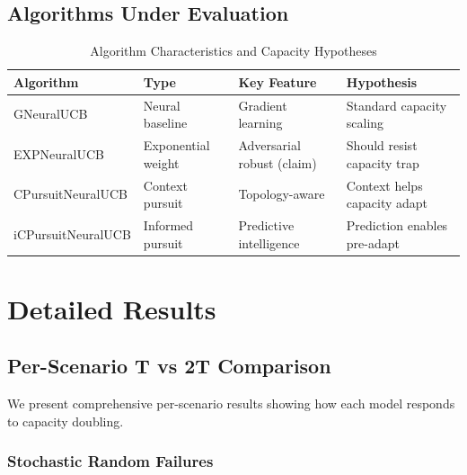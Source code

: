 \documentclass[11pt,a4paper]{article}
\begin{document}
\subsection{Algorithms Under Evaluation}

\vspace{-0.2cm}
\begin{table}[h]
\scriptsize
\centering
\begin{tabular}{llll}
\toprule
\textbf{Algorithm} & \textbf{Type} & \textbf{Key Feature} & \textbf{Hypothesis} \\
\midrule
GNeuralUCB & Neural baseline & Gradient learning & Standard capacity scaling \\
EXPNeuralUCB & Exponential weight & Adversarial robust (claim) & Should resist capacity trap \\
CPursuitNeuralUCB & Context pursuit & Topology-aware & Context helps capacity adapt \\
iCPursuitNeuralUCB & Informed pursuit & Predictive intelligence & Prediction enables pre-adapt \\
\bottomrule
\end{tabular}
\vspace{-0.2cm}
\caption{Algorithm Characteristics and Capacity Hypotheses}
\end{table}


\section{Detailed Results}

\subsection{Per-Scenario T vs 2T Comparison}

We present comprehensive per-scenario results showing how each model responds to capacity doubling.

\subsubsection{Stochastic Random Failures}
\end{document}
